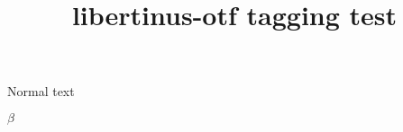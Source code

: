 \documentclass{article}
\title{libertinus-otf tagging test}
\begin{document}
Normal text

$β$


\LKeyWin

\LKeyStrg

\LKeyEnter



\end{document}
